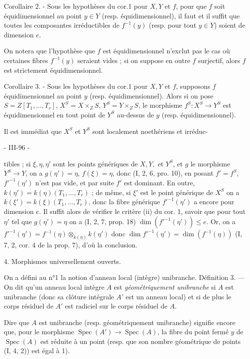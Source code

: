 Corollaire 2. - Sous les hypothèses du cor.1 pour $X, Y$ et $f$, pour que $f$ soit équidimensionnel au point $y \in Y$ (resp. équidimensionnel), il faut et il suffit que toutes les composantes irréductibles de $f^{-1}(y)$ (resp. pour tout $y \in Y$) soient de dimension $e$.

On notera que l'hypothèse que $f$ est équidimensionnel n'exclut pas le cas où certaines fibres $f^{-1}(y)$ seraient vides ; si on suppose en outre $f$ surjectif, alors $f$ est strictement équidimensionnel.

Corollaire 3. - Sous les hypothèses du cor.1 pour $X, Y$ et $f$, supposons $f$ équidimensionnel au point $y$ (resp. équidimensionnel). Alors si on pose $S = Z[T_1, \dots, T_r]$, $X^S = X \times_Z S$, $Y^S = Y \times_Z S$, le morphisme $f^S : X^S \to Y^S$ est équidimensionnel en tout point de $Y^S$ au-dessus de $y$ (resp. équidimensionnel).

Il est immédiat que $X^S$ et $Y^S$ sont localement noethériens et irréduc-

\newpage


- III-96 -

tibles ; si $\xi, \eta, \eta'$ sont les points génériques de $X, Y,$ et $Y^S$, et $g$ le morphisme $Y^S \to Y$, on a $g(\eta') = \eta$, $f(\xi) = \eta$, donc (I, 2, 6, pro. 10), en posant $f'=f^S$, $f'^{-1}(\eta')$ n'est pas vide, et par suite $f'$ est dominant. En outre, $k(\eta') = k(\eta)(T_1, \dots, T_r)$ ; de même, si $\xi'$ est le point générique de $X^S$ on a $k(\xi') = k(\xi)(T_1, \dots, T_r)$, donc la fibre générique $f'^{-1}(\eta')$ a encore pour dimension $e$. Il suffit alors de vérifier le critère (ii) du cor. 1, savoir que pour tout $\eta'$ tel que $g(\eta') = \eta$ on a (I, 2, 7, prop. 18) $\dim(f'^{-1}(\eta')) \le e$. Or, on a $f'^{-1}(\eta') = f^{-1}(\eta) \otimes_{k(\eta)} k(\eta')$ donc $\dim f'^{-1}(\eta') = \dim(f^{-1}(\eta))$ (I, 7, 2, cor. 4 de la prop. 7), d'où la conclusion.

4. Morphismes universellement ouverts.

On a défini au n°1 la notion d'anneau local (intègre) unibranche.
Définition 3. — On dit qu'un anneau local intègre $A$ est \emph{géométriquement unibranche} si $A$ est unibranche (donc sa clôture intégrale $A'$ est un anneau local) et si de plus le corps résiduel de $A'$ est radiciel sur le corps résiduel de $A$.

Dire que $A$ est unibranche (resp. géométriquement unibranche) signifie encore que, pour le morphisme $\operatorname{Spec}(A') \to \operatorname{Spec}(A)$, la fibre du point fermé $y$ de $\operatorname{Spec}(A)$ est réduite à un point (resp. que son nombre géométrique de points (I, 4, 2)) est égal à 1).

